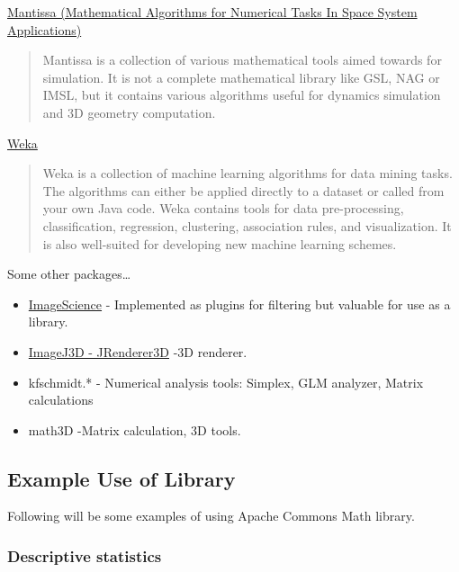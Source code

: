 \documentclass[11pt,a4paper,oneside]{report}
\begin{document}
\href{http://spaceroots.org/software/mantissa/index.html}
{Mantissa (Mathematical Algorithms for Numerical Tasks In Space System Applications)}
\begin{shaded}
\begin{quote}
Mantissa is a collection of various mathematical tools aimed towards for simulation. 
It is not a complete mathematical library like GSL, NAG or IMSL, but it contains various 
algorithms useful for dynamics simulation and 3D geometry computation.
\end{quote}
\end{shaded}

\href{http://www.cs.waikato.ac.nz/ml/weka/}{Weka}
\begin{shaded}
\begin{quote}
Weka is a collection of machine learning algorithms for data mining tasks. 
The algorithms can either be applied directly to a dataset or called from your own Java code. 
Weka contains tools for data pre-processing, classification, regression, 
clustering, association rules, and visualization. 
It is also well-suited for developing new machine learning schemes.
\end{quote}
\end{shaded}

Some other packages\dots

\begin{itemize}
\item \href{http://www.imagescience.org/meijering/software/}{ImageScience} - 
Implemented as plugins for filtering but valuable for use as a library. 
\item \href{http://www.f4.htw-berlin.de/~barthel/ImageJ/ImageJ3D/ImageJ3D.html}
{ImageJ3D - JRenderer3D} -3D renderer. 
\item kfschmidt.*  - Numerical analysis tools: Simplex, GLM analyzer, Matrix
calculations
\item math3D -Matrix calculation, 3D tools.  
\end{itemize}

\subsection{Example Use of Library}
Following will be some examples of using Apache Commons Math library. 
\subsubsection{Descriptive statistics}
\end{document}
